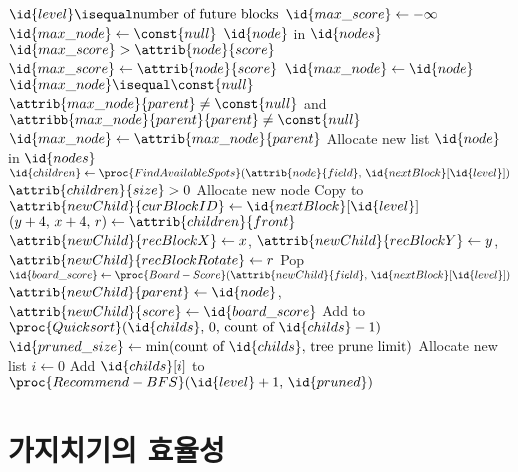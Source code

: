 \begin{codebox}
\li \If $\id{level} \isequal \mbox{number of future blocks}$ \Then
\li     $\id{max\_score} \gets -\infty$
\li     $\id{max\_node} \gets \const{null}$
\li     \For $\id{node}$ in $\id{nodes}$ \Do
\li         \If $\id{max\_score} > \attrib{node}{score}$ \Then
\li             $\id{max\_score} \gets \attrib{node}{score}$
\li             $\id{max\_node} \gets \id{node}$
            \End
        \End
\li     \If $\id{max\_node} \isequal \const{null}$ \Then
\li         \Return {}
        \End
\li     \While $\attrib{max\_node}{parent} \neq \const{null}$ and $\attribb{max\_node}{parent}{parent} \neq \const{null}$ \Then
\li         $\id{max\_node} \gets \attrib{max\_node}{parent}$
        \End
\li     \Return {}
    \End
\li Allocate new list 
\li \For $\id{node}$ in $\id{nodes}$ \Do
\li     $\id{children} \gets \proc{FindAvailableSpots}(\attrib{node}{field},\,\id{nextBlock}[\id{level}])$
\li     \While $\attrib{children}{size} > 0$ \Do
\li         Allocate new node 
\li         Copy  to 
\li         $\attrib{newChild}{curBlockID} \gets \id{nextBlock}[\id{level}]$
\li         $(y + 4,\,x + 4,\,r) \gets \attrib{children}{front}$
\li         $\attrib{newChild}{recBlockX} \gets x$, $\attrib{newChild}{recBlockY} \gets y$, $\attrib{newChild}{recBlockRotate} \gets r$
\li         Pop 
\li         $\id{board\_score} \gets \proc{Board-Score}(\attrib{newChild}{field},\,\id{nextBlock}[\id{level}])$
\li         $\attrib{newChild}{parent} \gets \id{node}$, $\attrib{newChild}{score} \gets \id{board\_score}$
\li         Add  to 
        \End
    \End
\li $\proc{Quicksort}(\id{childs},\,0,\,\mbox{count of }\id{childs}-1)$
\li $\id{pruned\_size} \gets \min(\mbox{count of }\id{childs},\,\mbox{tree prune limit})$
\li Allocate new list 
\li \For $i \gets 0$ \To {} \Do
\li     Add $\id{childs}[i]$ to 
    \End
\li \Return $\proc{Recommend-BFS}(\id{level} + 1,\,\id{pruned})$
\end{codebox}

\newpage

\section{가지치기의 효율성}

